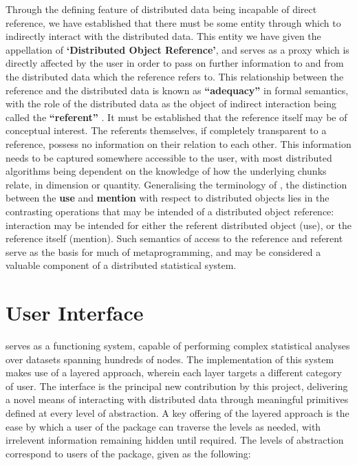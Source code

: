 \documentclass[letterpaper, inpress]{jds} %
\begin{document}
Through the defining feature of distributed data being incapable of direct reference, we have established that there must be some entity through which to indirectly interact with the distributed data.
This entity we have given the appellation of \textbf{`Distributed Object Reference'}, and serves as a proxy which is directly affected by the user in order to pass on further information to and from the distributed data which the reference refers to.
This relationship between the reference and the distributed data is known as \textbf{``adequacy''} in formal semantics, with the role of the distributed data as the object of indirect interaction being called the \textbf{``referent''} \citep{gordon1984}.
It must be established that the reference itself may be of conceptual interest.
The referents themselves, if completely transparent to a reference, possess no information on their relation to each other.
This information needs to be captured somewhere accessible to the user, with most distributed algorithms being dependent on the knowledge of how the underlying chunks relate, in dimension or quantity. 
Generalising the terminology of \citet{quine1979}, the distinction between the \textbf{use} and \textbf{mention} with respect to  distributed objects lies in the contrasting operations that may be intended of a distributed object reference: interaction may be intended for either the referent distributed object (use), or the reference itself (mention).
Such semantics of access to the reference and referent serve as the basis for much of metaprogramming, and may be considered a valuable component of a distributed statistical system.

\section{User Interface}\label{sec:ui}

 serves as a functioning system, capable of performing complex statistical analyses over datasets spanning hundreds of nodes.
The implementation of this system makes use of a layered approach, wherein each layer targets a different category of user.
The  interface is the principal new contribution by this project, delivering a novel means of interacting with distributed data through meaningful primitives defined at every level of abstraction.
A key offering of the layered approach is the ease by which a user of the package can traverse the levels as needed, with irrelevent information remaining hidden until required.
The levels of abstraction correspond to users of the package, given as the following:
\end{document}
